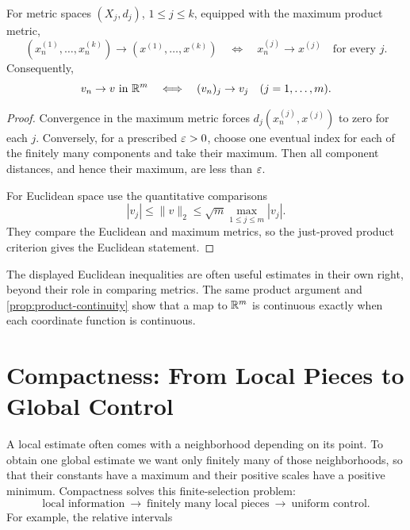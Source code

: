 \begin{proposition}
\label{prop:finite-product-convergence}
For metric spaces $(X_j,d_j)$, $1\leq j\leq k$, equipped with the maximum
product metric,
\[
(x_n^{(1)},\ldots,x_n^{(k)})\longrightarrow
(x^{(1)},\ldots,x^{(k)})
\quad\Longleftrightarrow\quad
x_n^{(j)}\longrightarrow x^{(j)}\quad\text{for every }j.
\]
Consequently,
\[
v_n\to v\text{ in }\mathbb{R}^m
\quad\Longleftrightarrow\quad
(v_n)_j\to v_j\quad(j=1,\ldots,m).
\]
\end{proposition}
\begin{proof}
Convergence in the maximum metric forces
$d_j(x_n^{(j)},x^{(j)})$ to zero for each $j$. Conversely, for a prescribed
$\varepsilon>0$, choose one eventual index for each of the finitely many components
and take their maximum. Then all component distances, and hence their
maximum, are less than $\varepsilon$.

For Euclidean space use the quantitative comparisons
\[
|v_j|\leq\|v\|_2
\leq\sqrt m\max_{1\leq j\leq m}|v_j|.
\]
They compare the Euclidean and maximum metrics, so the just-proved product
criterion gives the Euclidean statement.
\end{proof}
The displayed Euclidean inequalities are often useful estimates in their own
right, beyond their role in comparing metrics. The same product argument and
\cref{prop:product-continuity} show that a map to $\mathbb{R}^m$ is continuous
exactly when each coordinate function is continuous.

\section{Compactness: From Local Pieces to Global Control}
A local estimate often comes with a neighborhood depending on its point.
To obtain one global estimate we want only finitely many of those
neighborhoods, so that their constants have a maximum and their positive
scales have a positive minimum. Compactness solves this finite-selection
problem:
\[
\text{local information}\ \longrightarrow\ \text{finitely many local pieces}
\ \longrightarrow\ \text{uniform control}.
\]
For example, the relative intervals

